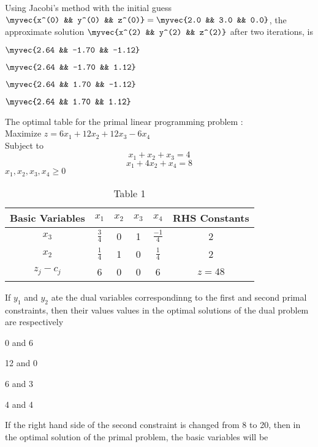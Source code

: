 		Using Jacobi's method with the initial guess $\myvec{x^(0) && y^(0) && z^(0)} = \myvec{2.0 && 3.0 && 0.0}$, the approximate solution $\myvec{x^(2) && y^(2) && z^(2)}$ after two iterations, is
		\begin{enumerate}
		\end{enumerate}
	The optimal table for the primal linear programming problem : \\
	Maximize $z = 6x_1 + 12x_2 + 12x_3 - 6x_4$ \\
	Subject to $$x_1 + x_2 + x_3 = 4 $$
	$$ x_1 + 4x_2 + x_4 = 8 $$ $x_1, x_2, x_3, x_4 \geq 0$
	\begin{table}[h]
	\centering
	\caption{Table 1}
	\begin{tabular}{|c|c|c|c|c|c|}
	\hline
	Basic Variables & $x_1$ & $x_2$ & $x_3$ & $x_4$ & RHS Constants \\
	\hline
	$x_3$ & $\frac{3}{4}$ & 0 & 1 & $\frac{-1}{4}$ & 2 \\
	\hline
	$x_2$ & $\frac{1}{4}$ & 1 & 0 & $\frac{1}{4}$ & 2 \\
	\hline
	$z_j - c_j$ & 6 & 0 & 0 & 6 & $z=48$ \\
	\hline
	\end{tabular}
	\label{tab: Table_1}
\end{table}
\item If $y_1$ and $y_2$ ate the dual variables correspondinng to the first and second primal constraints, then their values values in the optimal solutions of the dual problem are respectively
	\begin{enumerate}
			\begin{multicols}{2}
			\item 0 and 6
			\item 12 and 0
			\item 6 and 3
			\item 4 and 4
			\end{multicols}
	\end{enumerate}
\item If the right hand side of the second constraint is changed from 8 to 20, then in the optimal solution of the primal problem, the basic variables will be
